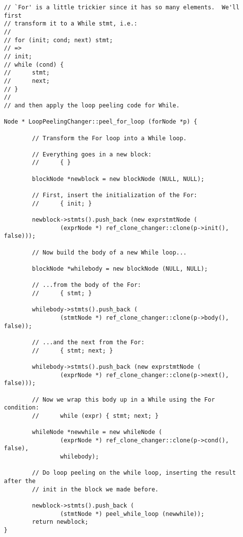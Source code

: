 \documentclass[10pt]{article}
\begin{document}
\begin{small}
\begin{verbatim}
// `For' is a little trickier since it has so many elements.  We'll first 
// transform it to a While stmt, i.e.:
//
// for (init; cond; next) stmt;
// =>
// init;
// while (cond) {
//      stmt;
//      next;
// }
//
// and then apply the loop peeling code for While.

Node * LoopPeelingChanger::peel_for_loop (forNode *p) {

        // Transform the For loop into a While loop.

        // Everything goes in a new block:
        //      { }

        blockNode *newblock = new blockNode (NULL, NULL);

        // First, insert the initialization of the For:
        //      { init; }

        newblock->stmts().push_back (new exprstmtNode (
                (exprNode *) ref_clone_changer::clone(p->init(), false)));

        // Now build the body of a new While loop...

        blockNode *whilebody = new blockNode (NULL, NULL);

        // ...from the body of the For:
        //      { stmt; }

        whilebody->stmts().push_back (
                (stmtNode *) ref_clone_changer::clone(p->body(), false));

        // ...and the next from the For:
        //      { stmt; next; }

        whilebody->stmts().push_back (new exprstmtNode (
                (exprNode *) ref_clone_changer::clone(p->next(), false)));

        // Now we wrap this body up in a While using the For condition:
        //      while (expr) { stmt; next; }

        whileNode *newwhile = new whileNode (
                (exprNode *) ref_clone_changer::clone(p->cond(), false),
                whilebody);

        // Do loop peeling on the while loop, inserting the result after the 
        // init in the block we made before.

        newblock->stmts().push_back (
                (stmtNode *) peel_while_loop (newwhile));
        return newblock;
}
\end{verbatim}
\end{small}
\end{document}
